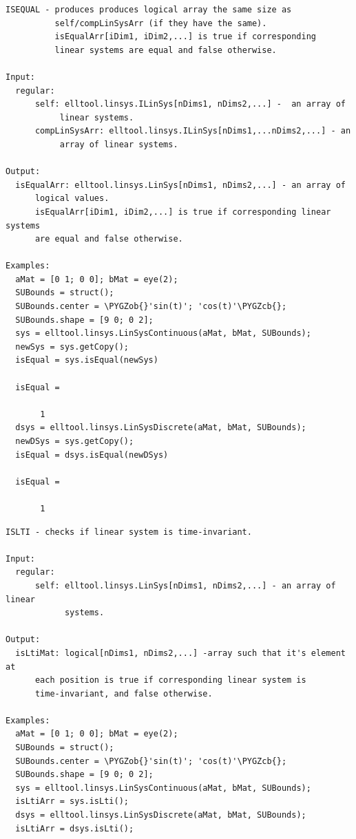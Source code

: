 \documentclass[letterpaper,10pt,english]{sphinxmanual}
\def\PYGZob{\char`\{}
\def\PYGZcb{\char`\}}
\begin{document}
\label{chap_func:elltool-linsys-alinsys-isequal}
\begin{Verbatim}[commandchars=\\\{\}]
ISEQUAL - produces produces logical array the same size as
          self/compLinSysArr (if they have the same).
          isEqualArr[iDim1, iDim2,...] is true if corresponding
          linear systems are equal and false otherwise.

Input:
  regular:
      self: elltool.linsys.ILinSys[nDims1, nDims2,...] -  an array of
           linear systems.
      compLinSysArr: elltool.linsys.ILinSys[nDims1,...nDims2,...] - an
           array of linear systems.

Output:
  isEqualArr: elltool.linsys.LinSys[nDims1, nDims2,...] - an array of
      logical values.
      isEqualArr[iDim1, iDim2,...] is true if corresponding linear systems
      are equal and false otherwise.

Examples:
  aMat = [0 1; 0 0]; bMat = eye(2);
  SUBounds = struct();
  SUBounds.center = \PYGZob{}'sin(t)'; 'cos(t)'\PYGZcb{};
  SUBounds.shape = [9 0; 0 2];
  sys = elltool.linsys.LinSysContinuous(aMat, bMat, SUBounds);
  newSys = sys.getCopy();
  isEqual = sys.isEqual(newSys)

  isEqual =

       1
  dsys = elltool.linsys.LinSysDiscrete(aMat, bMat, SUBounds);
  newDSys = sys.getCopy();
  isEqual = dsys.isEqual(newDSys)

  isEqual =

       1
\end{Verbatim}
\label{chap_func:elltool-linsys-alinsys-islti}
\begin{Verbatim}[commandchars=\\\{\}]
ISLTI - checks if linear system is time-invariant.

Input:
  regular:
      self: elltool.linsys.LinSys[nDims1, nDims2,...] - an array of linear
            systems.

Output:
  isLtiMat: logical[nDims1, nDims2,...] -array such that it's element at
      each position is true if corresponding linear system is
      time-invariant, and false otherwise.

Examples:
  aMat = [0 1; 0 0]; bMat = eye(2);
  SUBounds = struct();
  SUBounds.center = \PYGZob{}'sin(t)'; 'cos(t)'\PYGZcb{};
  SUBounds.shape = [9 0; 0 2];
  sys = elltool.linsys.LinSysContinuous(aMat, bMat, SUBounds);
  isLtiArr = sys.isLti();
  dsys = elltool.linsys.LinSysDiscrete(aMat, bMat, SUBounds);
  isLtiArr = dsys.isLti();
\end{Verbatim}
\end{document}
